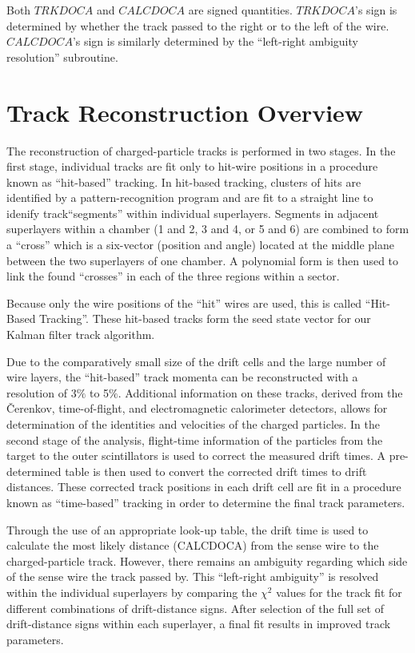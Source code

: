 \documentclass{article}
\begin{document}
Both $TRKDOCA$ and $CALCDOCA$ are signed quantities.
$TRKDOCA$'s sign is determined by whether the track passed
to the right or to the left of the wire.  $CALCDOCA$'s sign is similarly 
determined by the ``left-right ambiguity resolution'' subroutine.



\section{Track Reconstruction Overview}

The reconstruction of charged-particle tracks is performed in two stages.  In 
the first stage, individual tracks are fit only to hit-wire positions in a 
procedure known as ``hit-based'' tracking.  In hit-based tracking, clusters
of hits are identified by a pattern-recognition program and are fit to a straight line
to idenify track``segments'' within individual superlayers. Segments in adjacent
superlayers within a chamber (1 and 2, 3 and 4, or 5 and 6)
are combined to form a ``cross'' which is a six-vector 
(position and angle) located at the middle plane between the two superlayers
of one chamber.  A polynomial form is then used to link the found ``crosses'' in
each of the three regions within a sector. 

Because only the wire positions of
the ``hit'' wires are used, this is called ``Hit-Based Tracking''.
These hit-based tracks form the seed state vector for our Kalman filter track
algorithm.

Due to the comparatively small size of the drift cells and the large 
number of wire layers, the ``hit-based'' track momenta can be reconstructed with a 
resolution of 3$\%$ to 5$\%$.  Additional information on these tracks, derived
from the {\v C}erenkov, time-of-flight, and electromagnetic calorimeter 
detectors, allows for determination of the identities and velocities of the 
charged particles.  In the second stage of the analysis, flight-time 
information of the particles from the target to the outer scintillators is 
used to correct the measured drift times.  A pre-determined table is then used
to convert the corrected drift times to drift distances.  These corrected 
track positions in each drift cell are fit in a procedure known as 
``time-based'' tracking in order to determine the final track parameters.

Through the use of an appropriate look-up table, the drift time is used to 
calculate the most likely 
distance (CALCDOCA) from the sense wire to the charged-particle track.  
However, there remains an ambiguity regarding which side of the sense 
wire the track passed by.  This ``left-right ambiguity'' is resolved within 
the individual superlayers by comparing the $\chi^2$ values for the track fit 
for different combinations of drift-distance signs.  After selection of 
the full set of drift-distance signs within each superlayer, a final fit 
results in improved track parameters.
\end{document}
